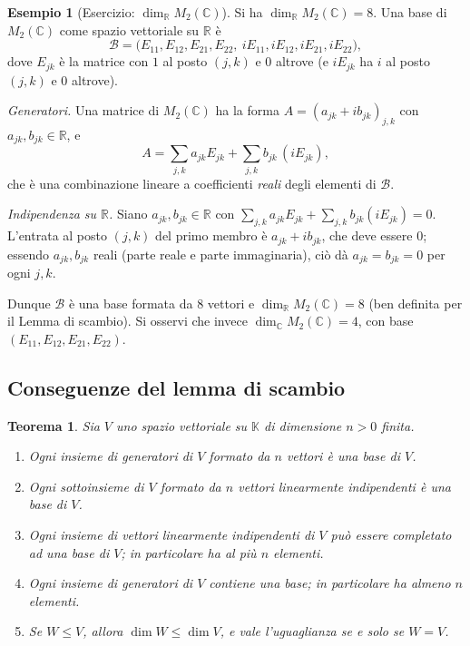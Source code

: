 \documentclass[11pt,a4paper]{article}
\newcommand{\RR}{\mathbb{R}}
\newcommand{\CC}{\mathbb{C}}
\newcommand{\KK}{\mathbb{K}}
\theoremstyle{plain}
\newtheorem{teo}[prop]{Teorema}
\theoremstyle{definition}
\newtheorem{esempio}[prop]{Esempio}
\theoremstyle{remark}
\begin{document}
\begin{esempio}[Esercizio: $\dim_{\RR}M_2(\CC)$]
Si ha $\dim_{\RR}M_2(\CC)=8$. Una base di $M_2(\CC)$ come spazio vettoriale su $\RR$ è
\[
  \mathcal B=\bigl(E_{11},E_{12},E_{21},E_{22},\ iE_{11},iE_{12},iE_{21},iE_{22}\bigr),
\]
dove $E_{jk}$ è la matrice con $1$ al posto $(j,k)$ e $0$ altrove (e $iE_{jk}$ ha $i$ al posto $(j,k)$ e $0$ altrove).

\emph{Generatori.} Una matrice di $M_2(\CC)$ ha la forma $A=(a_{jk}+ib_{jk})_{j,k}$ con $a_{jk},b_{jk}\in\RR$, e
\[
  A=\sum_{j,k}a_{jk}E_{jk}+\sum_{j,k}b_{jk}\,(iE_{jk}),
\]
che è una combinazione lineare a coefficienti \emph{reali} degli elementi di $\mathcal B$.

\emph{Indipendenza su $\RR$.} Siano $a_{jk},b_{jk}\in\RR$ con $\sum_{j,k}a_{jk}E_{jk}+\sum_{j,k}b_{jk}(iE_{jk})=0$. L'entrata al posto $(j,k)$ del primo membro è $a_{jk}+ib_{jk}$, che deve essere $0$; essendo $a_{jk},b_{jk}$ reali (parte reale e parte immaginaria), ciò dà $a_{jk}=b_{jk}=0$ per ogni $j,k$.

Dunque $\mathcal B$ è una base formata da $8$ vettori e $\dim_{\RR}M_2(\CC)=8$ (ben definita per il Lemma di scambio). Si osservi che invece $\dim_{\CC}M_2(\CC)=4$, con base $(E_{11},E_{12},E_{21},E_{22})$.
\end{esempio}

\subsection{Conseguenze del lemma di scambio}

\begin{teo}\label{teo:dimensione}
Sia $V$ uno spazio vettoriale su $\KK$ di dimensione $n>0$ finita.
\begin{enumerate}[label=(\roman*)]
  \item Ogni insieme di generatori di $V$ formato da $n$ vettori è una base di $V$.
  \item Ogni sottoinsieme di $V$ formato da $n$ vettori linearmente indipendenti è una base di $V$.
  \item Ogni insieme di vettori linearmente indipendenti di $V$ può essere completato ad una base di $V$; in particolare ha al più $n$ elementi.
  \item Ogni insieme di generatori di $V$ contiene una base; in particolare ha almeno $n$ elementi.
  \item Se $W\leq V$, allora $\dim W\leq\dim V$, e vale l'uguaglianza se e solo se $W=V$.
\end{enumerate}
\end{teo}
\end{document}
